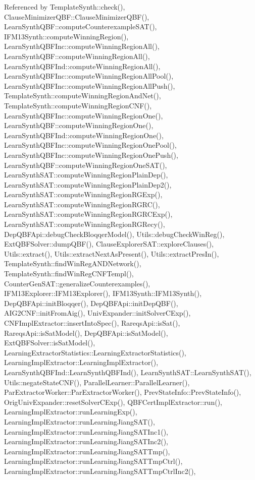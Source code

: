 Referenced by Template\-Synth\-::check(), Clause\-Minimizer\-Q\-B\-F\-::\-Clause\-Minimizer\-Q\-B\-F(), Learn\-Synth\-Q\-B\-F\-::compute\-Counterexample\-S\-A\-T(), I\-F\-M13\-Synth\-::compute\-Winning\-Region(), Learn\-Synth\-Q\-B\-F\-Inc\-::compute\-Winning\-Region\-All(), Learn\-Synth\-Q\-B\-F\-::compute\-Winning\-Region\-All(), Learn\-Synth\-Q\-B\-F\-Ind\-::compute\-Winning\-Region\-All(), Learn\-Synth\-Q\-B\-F\-Inc\-::compute\-Winning\-Region\-All\-Pool(), Learn\-Synth\-Q\-B\-F\-Inc\-::compute\-Winning\-Region\-All\-Push(), Template\-Synth\-::compute\-Winning\-Region\-And\-Net(), Template\-Synth\-::compute\-Winning\-Region\-C\-N\-F(), Learn\-Synth\-Q\-B\-F\-Inc\-::compute\-Winning\-Region\-One(), Learn\-Synth\-Q\-B\-F\-::compute\-Winning\-Region\-One(), Learn\-Synth\-Q\-B\-F\-Ind\-::compute\-Winning\-Region\-One(), Learn\-Synth\-Q\-B\-F\-Inc\-::compute\-Winning\-Region\-One\-Pool(), Learn\-Synth\-Q\-B\-F\-Inc\-::compute\-Winning\-Region\-One\-Push(), Learn\-Synth\-Q\-B\-F\-::compute\-Winning\-Region\-One\-S\-A\-T(), Learn\-Synth\-S\-A\-T\-::compute\-Winning\-Region\-Plain\-Dep(), Learn\-Synth\-S\-A\-T\-::compute\-Winning\-Region\-Plain\-Dep2(), Learn\-Synth\-S\-A\-T\-::compute\-Winning\-Region\-R\-G\-Exp(), Learn\-Synth\-S\-A\-T\-::compute\-Winning\-Region\-R\-G\-R\-C(), Learn\-Synth\-S\-A\-T\-::compute\-Winning\-Region\-R\-G\-R\-C\-Exp(), Learn\-Synth\-S\-A\-T\-::compute\-Winning\-Region\-R\-G\-Recy(), Dep\-Q\-B\-F\-Api\-::debug\-Check\-Bloqqer\-Model(), Utils\-::debug\-Check\-Win\-Reg(), Ext\-Q\-B\-F\-Solver\-::dump\-Q\-B\-F(), Clause\-Explorer\-S\-A\-T\-::explore\-Clauses(), Utils\-::extract(), Utils\-::extract\-Next\-As\-Present(), Utils\-::extract\-Pres\-In(), Template\-Synth\-::find\-Win\-Reg\-A\-N\-D\-Network(), Template\-Synth\-::find\-Win\-Reg\-C\-N\-F\-Templ(), Counter\-Gen\-S\-A\-T\-::generalize\-Counterexamples(), I\-F\-M13\-Explorer\-::\-I\-F\-M13\-Explorer(), I\-F\-M13\-Synth\-::\-I\-F\-M13\-Synth(), Dep\-Q\-B\-F\-Api\-::init\-Bloqqer(), Dep\-Q\-B\-F\-Api\-::init\-Dep\-Q\-B\-F(), A\-I\-G2\-C\-N\-F\-::init\-From\-Aig(), Univ\-Expander\-::init\-Solver\-C\-Exp(), C\-N\-F\-Impl\-Extractor\-::insert\-Into\-Spec(), Rareqs\-Api\-::is\-Sat(), Rareqs\-Api\-::is\-Sat\-Model(), Dep\-Q\-B\-F\-Api\-::is\-Sat\-Model(), Ext\-Q\-B\-F\-Solver\-::is\-Sat\-Model(), Learning\-Extractor\-Statistics\-::\-Learning\-Extractor\-Statistics(), Learning\-Impl\-Extractor\-::\-Learning\-Impl\-Extractor(), Learn\-Synth\-Q\-B\-F\-Ind\-::\-Learn\-Synth\-Q\-B\-F\-Ind(), Learn\-Synth\-S\-A\-T\-::\-Learn\-Synth\-S\-A\-T(), Utils\-::negate\-State\-C\-N\-F(), Parallel\-Learner\-::\-Parallel\-Learner(), Par\-Extractor\-Worker\-::\-Par\-Extractor\-Worker(), Prev\-State\-Info\-::\-Prev\-State\-Info(), Orig\-Univ\-Expander\-::reset\-Solver\-C\-Exp(), Q\-B\-F\-Cert\-Impl\-Extractor\-::run(), Learning\-Impl\-Extractor\-::run\-Learning\-Exp(), Learning\-Impl\-Extractor\-::run\-Learning\-Jiang\-S\-A\-T(), Learning\-Impl\-Extractor\-::run\-Learning\-Jiang\-S\-A\-T\-Inc1(), Learning\-Impl\-Extractor\-::run\-Learning\-Jiang\-S\-A\-T\-Inc2(), Learning\-Impl\-Extractor\-::run\-Learning\-Jiang\-S\-A\-T\-Tmp(), Learning\-Impl\-Extractor\-::run\-Learning\-Jiang\-S\-A\-T\-Tmp\-Ctrl(), Learning\-Impl\-Extractor\-::run\-Learning\-Jiang\-S\-A\-T\-Tmp\-Ctrl\-Inc2(), 